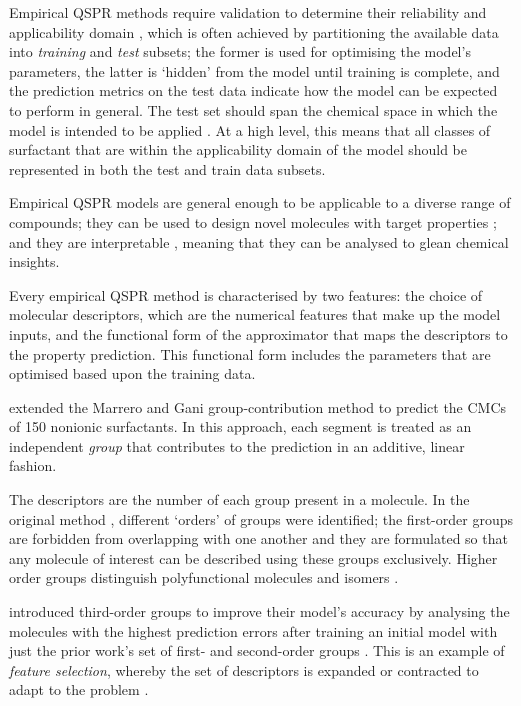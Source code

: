 Empirical QSPR methods require validation to determine their reliability and
applicability domain
\cite{veerasamyValidationQSARModelsstrategies2011,tropshaBestPracticesQSAR2010,leonardSelectionTrainingTest2006},
which is often achieved by partitioning the available data into \emph{training}
and \emph{test} subsets; the former is used for optimising the model's
parameters, the latter is `hidden' from the model until training is complete,
and the prediction metrics on the test data indicate how the model can be
expected to perform in general. The test set should span the chemical space in
which the model is intended to be applied
\cite{leonardSelectionTrainingTest2006}. At a high level, this means that all
classes of surfactant that are within the applicability domain of the model
should be represented in both the test and train data subsets.

Empirical QSPR models are general enough to be applicable to a diverse range of
compounds; they can be used to design novel molecules with target properties
\cite{gantzerInverseQSPRNovoDesign2020,bolboacaMolecularDesignQSARs2013}; and
they are interpretable \cite{zefirovFragmentalApproachQSPR2002}, meaning that
they can be analysed to glean chemical insights.

Every empirical QSPR method is characterised by two features: the choice of
molecular descriptors, which are the numerical features that make up the model
inputs, and the functional form of the approximator that maps the descriptors to
the property prediction. This functional form includes the parameters that are
optimised based upon the training data.

\citet{matteiModelingCriticalMicelle2013} extended the Marrero and Gani
group-contribution method \cite{ganiAutomaticCreationMissing2005} to predict the
CMCs of 150 nonionic surfactants. In this approach, each segment is treated as
an independent \emph{group} that contributes to the prediction in an additive,
linear fashion.

The descriptors are the number of each group present in a molecule. In the
original method \cite{ganiAutomaticCreationMissing2005}, different `orders' of
groups were identified; the first-order groups are forbidden from overlapping
with one another and they are formulated so that any molecule of interest can be
described using these groups exclusively. Higher order groups distinguish
polyfunctional molecules and isomers \cite{ganiAutomaticCreationMissing2005}.

\citet{matteiModelingCriticalMicelle2013} introduced third-order groups to
improve their model's accuracy by analysing the molecules with the highest
prediction errors after training an initial model with just the prior work's set
of first- and second-order groups \cite{ganiAutomaticCreationMissing2005}. This
is an example of \emph{feature selection}, whereby the set of descriptors is
expanded or contracted to adapt to the problem
\cite{liFeatureSelectionData2017,guyonIntroductionVariableFeature2003}.

